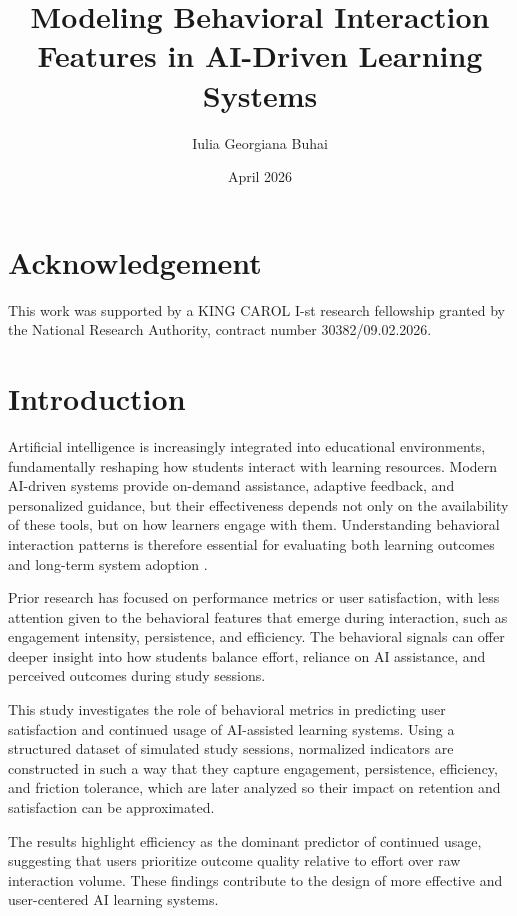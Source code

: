 \documentclass{article}
\title{Modeling Behavioral Interaction Features in AI-Driven Learning Systems}
\author{Iulia Georgiana Buhai}
\date{April 2026}
\begin{document}
\maketitle

\section*{Acknowledgement}

    This work was supported by a KING CAROL I-st research fellowship granted by the National Research Authority, contract number 30382/09.02.2026.


\tableofcontents

\section{Introduction}

Artificial intelligence is increasingly integrated into educational environments, fundamentally reshaping how students interact with learning resources. Modern AI-driven systems provide on-demand assistance, adaptive feedback, and personalized guidance, but their effectiveness depends not only on the availability of these tools, but on how learners engage with them. Understanding behavioral interaction patterns is therefore essential for evaluating both learning outcomes and long-term system adoption \cite{siemens2012learning}.

Prior research has focused on performance metrics or user satisfaction, with less attention given to the behavioral features that emerge during interaction, such as engagement intensity, persistence, and efficiency. The behavioral signals can offer deeper insight into how students balance effort, reliance on AI assistance, and perceived outcomes during study sessions\cite{fredricks2004school}.

This study investigates the role of behavioral metrics in predicting user satisfaction and continued usage of AI-assisted learning systems. Using a structured dataset of simulated study sessions,  normalized indicators are constructed in such a way that they capture engagement, persistence, efficiency, and friction tolerance, which are later analyzed so their impact on retention and satisfaction can be approximated.

The results highlight efficiency as the dominant predictor of continued usage, suggesting that users prioritize outcome quality relative to effort over raw interaction volume. These findings contribute to the design of more effective and user-centered AI learning systems.
\end{document}
